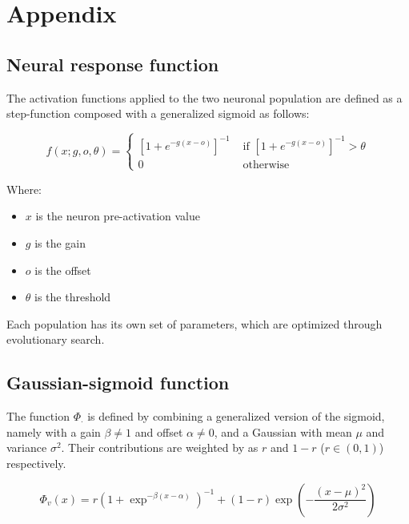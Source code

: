 \section{Appendix}\label{sec:appendix}


\subsection{Neural response function}

The activation functions applied to the two neuronal population are defined as a step-function composed with a generalized sigmoid as follows:

\begin{equation}
f(x; g, o, \theta) =
\begin{cases}
    \left[1 + e^{-g(x - o)}\right]^{-1} & \text{ if } \left[1 + e^{-g(x - o)}\right]^{-1} > \theta \\
0 & \text{ otherwise}
\end{cases}
\end{equation}

Where:
\begin{itemize}
\item $x$ is the neuron pre-activation value
\item $g$ is the gain
\item $o$ is the offset
\item $\theta$ is the threshold
\end{itemize}
\noindent Each population has its own set of parameters, which are optimized through evolutionary search.


\subsection{Gaussian-sigmoid function}\label{func:gs}

\noindent The function $\Phi_{\cdot}$ is defined by combining a generalized version of the sigmoid, namely with a gain $\beta \neq 1$ and offset $\alpha\neq 0$, and a Gaussian with mean $\mu$ and variance $\sigma^{2}$. Their contributions are weighted by as $r$ and $1-r$ ($r\in(0,1)$) respectively.

\begin{equation*}
    \Phi_v(x) = r\left(1 + \exp^{-\beta(x-\alpha)}\right)^{-1} + (1-r)\exp\left(-\frac{(x-\mu)^2}{2\sigma^2}\right)
\end{equation*}

